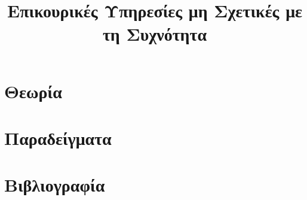\title{Επικουρικές Υπηρεσίες μη Σχετικές με τη Συχνότητα}

\section{Θεωρία}
\label{kef-02-theoria}

\section{Παραδείγματα}
\label{kef-02-paradeigmata}

\section{Βιβλιογραφία}
\label{kef-02-vivliografia}
